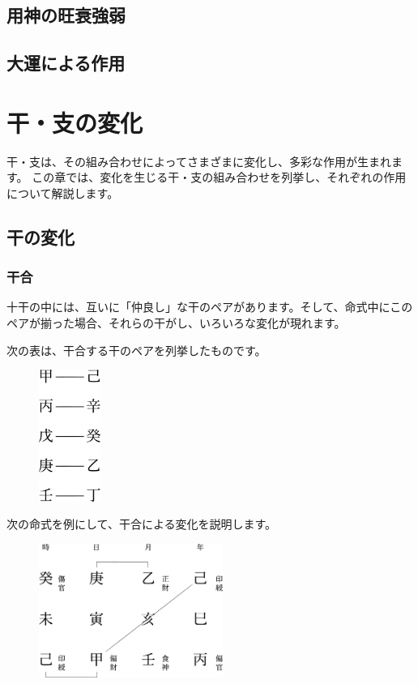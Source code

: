 \documentclass[a5paper,11pt,dvipdfmx]{tarticle}
\begin{document}
\subsection{用神の旺衰強弱}


\subsection{大運による作用}



\clearpage

\section{干・支の変化}

干・支は、その組み合わせによってさまざまに変化し、多彩な作用が生まれます。
この章では、変化を生じる干・支の組み合わせを列挙し、それぞれの作用について解説します。

\subsection{干の変化}

\subsubsection*{干合}
十干の中には、互いに「仲良し」な干のペアがあります。そして、命式中にこのペアが揃った場合、それらの干がし、いろいろな変化が現れます。

次の表は、干合する干のペアを列挙したものです。

\begin{figure}[h]
 \includegraphics[width=20mm,angle=90]{figs/table7-1.eps}
\end{figure}

次の命式を例にして、干合による変化を説明します。

\begin{figure}[h]
  \includegraphics[width=60mm,angle=90]{figs/figure7-1.eps}
\end{figure}
\end{document}
